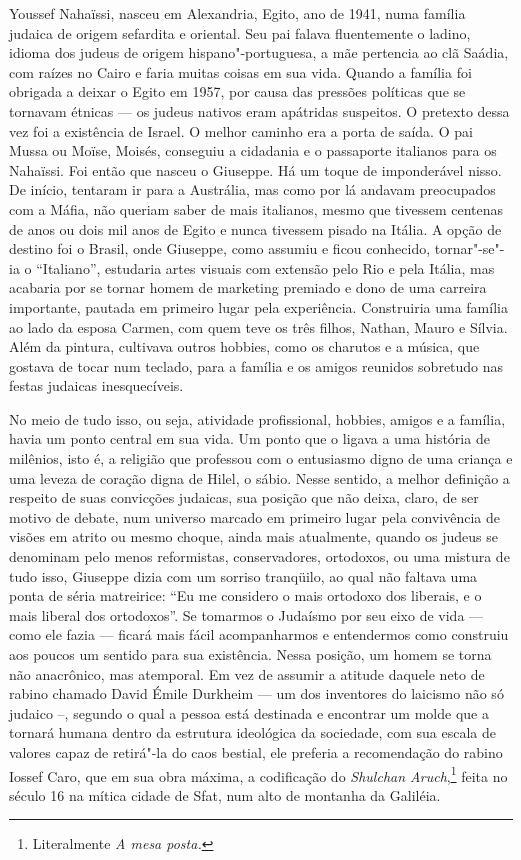 Youssef Nahaïssi, nasceu em Alexandria, Egito, ano de 1941, numa família
judaica de origem sefardita e oriental. Seu pai falava fluentemente o
ladino, idioma dos judeus de origem hispano"-portuguesa, a mãe pertencia
ao clã Saádia, com raízes no Cairo e faria muitas coisas em sua vida.
Quando a família foi obrigada a deixar o Egito em 1957, por causa das
pressões políticas que se tornavam étnicas --- os judeus nativos eram
apátridas suspeitos. O pretexto dessa vez foi a existência de Israel. O
melhor caminho era a porta de saída. O pai Mussa ou Moïse, Moisés,
conseguiu a cidadania e o passaporte italianos para os Nahaïssi. Foi
então que nasceu o Giuseppe. Há um toque de imponderável nisso. De
início, tentaram ir para a Austrália, mas como por lá andavam
preocupados com a Máfia, não queriam saber de mais italianos, mesmo que
tivessem centenas de anos ou dois mil anos de Egito e nunca tivessem
pisado na Itália. A opção de destino foi o Brasil, onde Giuseppe, como
assumiu e ficou conhecido, tornar"-se"-ia o ``Italiano'', estudaria artes
visuais com extensão pelo Rio e pela Itália, mas acabaria por se tornar
homem de marketing premiado e dono de uma carreira importante, pautada
em primeiro lugar pela experiência. Construiria uma família ao lado da
esposa Carmen, com quem teve os três filhos, Nathan, Mauro e Sílvia.
Além da pintura, cultivava outros hobbies, como os charutos e a música,
que gostava de tocar num teclado, para a família e os amigos reunidos
sobretudo nas festas judaicas inesquecíveis.

No meio de tudo isso, ou seja, atividade profissional, hobbies, amigos e
a família, havia um ponto central em sua vida. Um ponto que o ligava a
uma história de milênios, isto é, a religião que professou com o
entusiasmo digno de uma criança e uma leveza de coração digna de Hilel,
o sábio. Nesse sentido, a melhor definição a respeito de suas convicções
judaicas, sua posição que não deixa, claro, de ser motivo de debate, num
universo marcado em primeiro lugar pela convivência de visões em atrito
ou mesmo choque, ainda mais atualmente, quando os judeus se denominam
pelo menos reformistas, conservadores, ortodoxos, ou uma mistura de tudo
isso, Giuseppe dizia com um sorriso tranqüilo, ao qual não faltava uma
ponta de séria matreirice: ``Eu me considero o mais ortodoxo dos
liberais, e o mais liberal dos ortodoxos''. Se tomarmos o Judaísmo por
seu eixo de vida --- como ele fazia --- ficará mais fácil acompanharmos e
entendermos como construiu aos poucos um sentido para sua existência.
Nessa posição, um homem se torna não anacrônico, mas atemporal. Em vez
de assumir a atitude daquele neto de rabino chamado David Émile Durkheim
--- um dos inventores do laicismo não só judaico --, segundo o qual a
pessoa está destinada e encontrar um molde que a tornará humana dentro
da estrutura ideológica da sociedade, com sua escala de valores capaz de
retirá"-la do caos bestial, ele preferia a recomendação do rabino Iossef
Caro, que em sua obra máxima, a codificação do \emph{Shulchan Aruch},\footnote{Literalmente \emph{A mesa posta.}} feita no século 16 na mítica cidade de Sfat, num alto de montanha da Galiléia.

